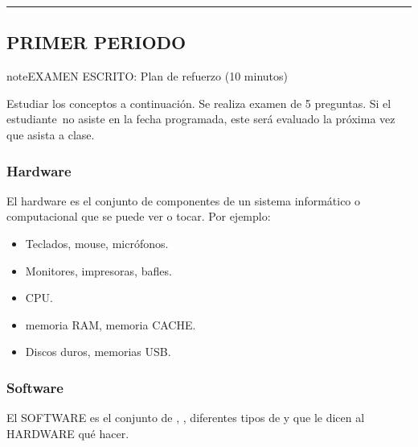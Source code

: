 \documentclass[letterpaper,10pt,spanish]{sphinxmanual}
\begin{document}
\bigskip\hrule\bigskip



\subsection{PRIMER PERIODO}
\label{\detokenize{1_guias/8logica/G829:primer-periodo}}
\begin{sphinxadmonition}{note}{EXAMEN ESCRITO: Plan de refuerzo (10 minutos)}

\sphinxAtStartPar
Estudiar los conceptos a continuación. Se realiza examen de 5 preguntas. Si el estudiante no asiste en la fecha programada, este será evaluado la próxima vez que asista a clase.
\end{sphinxadmonition}


\subsubsection{Hardware}
\label{\detokenize{1_guias/8logica/G829:hardware}}
\sphinxAtStartPar
El hardware es el conjunto de componentes de un sistema informático o computacional que se puede ver o tocar. Por ejemplo:
\begin{itemize}
\item {} 
\sphinxAtStartPar
{} Teclados, mouse, micrófonos.

\item {} 
\sphinxAtStartPar
{} Monitores, impresoras, bafles.

\item {} 
\sphinxAtStartPar
{} CPU.

\item {} 
\sphinxAtStartPar
{} memoria RAM, memoria CACHE.

\item {} 
\sphinxAtStartPar
{} Discos duros, memorias USB.

\end{itemize}


\subsubsection{Software}
\label{\detokenize{1_guias/8logica/G829:software}}
\sphinxAtStartPar
El SOFTWARE es el conjunto de , , diferentes tipos de  y  que le dicen al HARDWARE qué hacer.
\end{document}
